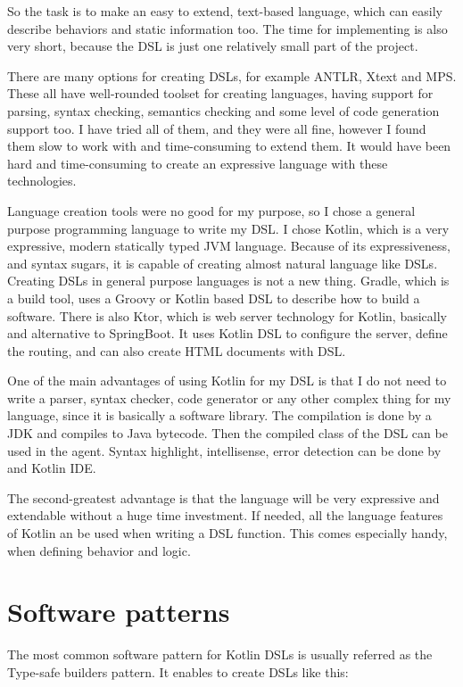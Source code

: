 So the task is to make an easy to extend, text-based language, which can easily describe behaviors and static information too. The time for implementing is also very short, because the DSL is just one relatively small part of the project.

There are many options for creating DSLs, for example ANTLR, Xtext and MPS. These all have well-rounded toolset for creating languages, having support for parsing, syntax checking, semantics checking and some level of code generation support too. I have tried all of them, and they were all fine, however I found them slow to work with and time-consuming to extend them. It would have been hard and time-consuming to create an expressive language with these technologies.

Language creation tools were no good for my purpose, so I chose a general purpose programming language to write my DSL. I chose Kotlin, which is a very expressive, modern statically typed JVM language. Because of its expressiveness, and syntax sugars, it is capable of creating almost natural language like DSLs. Creating DSLs in general purpose languages is not a new thing. Gradle, which is a build tool, uses a Groovy or Kotlin based DSL to describe how to build a software. There is also Ktor, which is web server technology for Kotlin, basically and alternative to SpringBoot. It uses Kotlin DSL to configure the server, define the routing, and can also create HTML documents with DSL.

One of the main advantages of using Kotlin for my DSL is that I do not need to write a parser, syntax checker, code generator or any other complex thing for my language, since it is basically a software library. The compilation is done by a JDK and compiles to Java bytecode. Then the compiled class of the DSL can be used in the agent. Syntax highlight, intellisense, error detection can be done by and Kotlin IDE.

The second-greatest advantage is that the language will be very expressive and extendable without a huge time investment. If needed, all the language features of Kotlin an be used when writing a DSL function. This comes especially handy, when defining behavior and logic.

\section{Software patterns}

The most common software pattern for Kotlin DSLs is usually referred as the Type-safe builders pattern. It enables to create DSLs like this:


